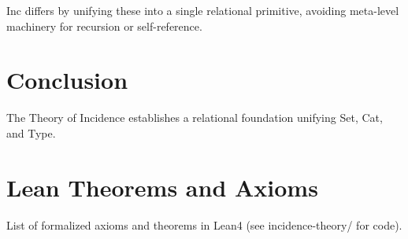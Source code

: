 \documentclass{article}
\begin{document}
Inc differs by unifying these into a single relational primitive, avoiding meta-level machinery for recursion or self-reference.

\section{Conclusion}
The Theory of Incidence establishes a relational foundation unifying Set, Cat, and Type.

\appendix
\section{Lean Theorems and Axioms}
List of formalized axioms and theorems in Lean4 (see incidence-theory/ for code).
\end{document}
